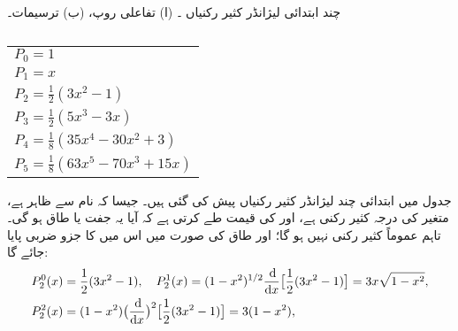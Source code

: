 \begin{table}
\caption{چند ابتدائی لیژانڈر کثیر رکنیاں ۔ (ا) تفاعلی روپ، (ب) ترسیمات۔}
\label{جدول_ابعاد_لیژانڈر_چند_ابتدائی}
\centering
\begin{subtable}{0.45\textwidth}
\centering
\begin{tabular}{l}
$P_0=1$\\[0.25em]
$P_1=x$\\[0.25em]
$P_2=\frac{1}{2}(3x^2-1)$\\[0.25em]
$P_3=\frac{1}{2}(5x^3-3x)$\\[0.25em]
$P_4=\frac{1}{8}(35x^4-30x^2+3)$\\[0.25em]
$P_5=\frac{1}{8}(63x^5-70x^3+15x)$
\end{tabular}
\caption{}
\end{subtable}\hfill
\begin{subtable}{0.45\textwidth}
\centering
{}
\caption{}
\end{subtable}
\end{table}
جدول  میں ابتدائی چند لیژانڈر کثیر رکنیاں پیش کی گئی ہیں۔ جیسا کہ نام سے  ظاہر ہے،  متغیر  کی درجہ  کثیر رکنی ہے، اور  کی قیمت طے  کرتی ہے کہ آیا یہ جفت یا طاق ہو گی۔ تاہم    عموماً کثیر رکنی نہیں ہو گا؛ اور طاق  کی صورت میں اس میں  کا جزو ضربی پایا جائے گا:
\begin{align*}
P_{2}^{0}(x)&=\frac{1}{2}(3x^{2}-1), \quad P_{2}^{1}(x)=(1-x^{2})^{1/2}\frac{\dif}{\dif{x}}\big[\frac{1}{2}(3x^{2}-1)\big]=3x\sqrt{1-x^{2}}, \\
P_{2}^{2}(x)&=(1-x^{2})\big(\frac{\dif}{\dif{x}}\big)^{2}\big[\frac{1}{2}(3x^{2}-1)\big]=3(1-x^{2}),
\end{align*}
